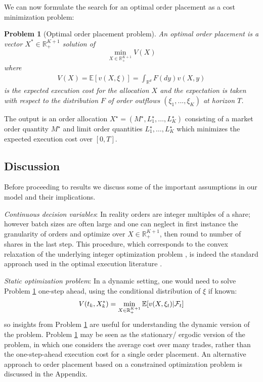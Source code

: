 \documentclass[opre,nonblindrev]{informs3}
\newtheorem{myproblem}{Problem}
\begin{document}
We can now formulate the search for an optimal order placement as a cost minimization problem:
\begin{myproblem}[Optimal order placement problem]\label{prob.optimalplacement}
An {\it optimal order placement} is a vector $X^*\in\mathbb{R}^{K+1}_+$ solution of
\begin{equation}\label{optim.set}
\min_{X\in\mathbb{R}^{K+1}_+}V(X)
\end{equation}
\noindent where
\begin{align}
V(X)= \mathbb{E}[ v(X,\xi) ]= \int_{\mathbb{R}^d} F(dy) v(X,y)
\end{align}
\noindent is the expected execution cost for the allocation $X$ and the expectation is taken with respect to the distribution  $F$ of  order outflows $(\xi_1,...,\xi_K)$ at horizon $T$.
\end{myproblem}
\noindent 
The output is an order allocation $X^\star=(M^\star,L^\star_1,\dots,L^\star_K)$  consisting of a market order quantity $M^\star$ and limit order quantities $L^\star_1,\dots,L^\star_K$ which minimizes the expected execution cost over $[0,T]$.

\subsection{Discussion}

Before proceeding to results we discuss some of the important assumptions in our model and their implications.

{\it Continuous decision variables}: In reality orders are integer multiples of a share; however batch sizes are often large and one can neglect in first instance the granularity of orders and optimize over $X\in \mathbb{R}^{K+1}_+$, then round to number of shares in the last step. This procedure, which corresponds to the convex relaxation of the underlying integer optimization problem \citep{williamson2011}, is indeed the standard approach used in the optimal execution literature \cite{almgren00,Alfonsi2010,Bayraktar2011,Guilbaud2012}.

{\it Static optimization problem}: In a dynamic setting, one would need to solve Problem \ref{prob.optimalplacement} one-step ahead, using the conditional distribution of $\xi$ if known:
\begin{equation} 
V(t_k,X_k^*)=\min_{X\in\mathbb{R}^{K+1}_+}  \mathbb{E}[ v(X,\xi_t)|{\cal F}_t ]
\end{equation}
so insights from Problem \ref{prob.optimalplacement} are useful for understanding the dynamic version of the problem. Problem \ref{prob.optimalplacement} may be seen as the stationary/ ergodic version of the problem, in which one considers the average cost over many trades, rather than the one-step-ahead execution cost for a single order placement. An alternative approach to order placement based on a constrained optimization problem is discussed in the Appendix.
\end{document}
